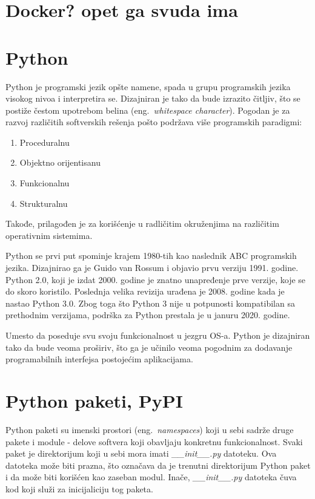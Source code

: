 \documentclass[12pt]{report}
\begin{document}
\section{Docker? opet ga svuda ima}
\section{Python}

Python \cite{python} je programski jezik opšte namene, spada u grupu programskih jezika visokog nivoa i interpretira se. Dizajniran je tako da bude izrazito čitljiv, što se postiže čestom upotrebom belina (eng.\ \textit{whitespace character}). Pogodan je za razvoj različitih softverskih rešenja pošto podržava više programskih paradigmi:

\begin{enumerate}
    \item Proceduralnu
    \item Objektno orijentisanu
    \item Funkcionalnu
    \item Strukturalnu
\end{enumerate}

Takođe, prilagođen je za korišćenje u radličitim okruženjima na različitim operativnim sistemima.

Python se prvi put spominje krajem 1980-tih kao naslednik ABC programskih jezika. Dizajnirao ga je Guido van Rossum i objavio prvu verziju 1991. godine. Python 2.0, koji je izdat 2000. godine je znatno unapređenje prve verzije, koje se do skoro koristilo.  Poslednja velika revizija urađena je 2008. godine kada je nastao Python 3.0. Zbog toga što Python 3 nije u potpunosti kompatibilan sa prethodnim verzijama, podrška za Python prestala je u januru 2020. godine.

Umesto da poseduje svu svoju funkcionalnost u jezgru OS-a. Python je dizajniran tako da  bude veoma proširiv, što ga je učinilo veoma pogodnim za dodavanje programabilnih interfejsa postojećim aplikacijama.

\section{Python paketi, PyPI}

Python paketi su imenski prostori (eng.\ \textit{namespaces}) koji u sebi sadrže druge pakete i module - delove softvera koji obavljaju konkretnu funkcionalnost. Svaki paket je direktorijum koji u sebi mora imati \textit{\_\_init\_\_.py} datoteku. Ova datoteka može biti prazna, što označava da je trenutni direktorijum Python paket i da može biti korišćen kao zaseban modul. Inače, \textit{\_\_init\_\_.py} datoteka čuva kod koji služi za inicijaliciju tog paketa.
\end{document}
